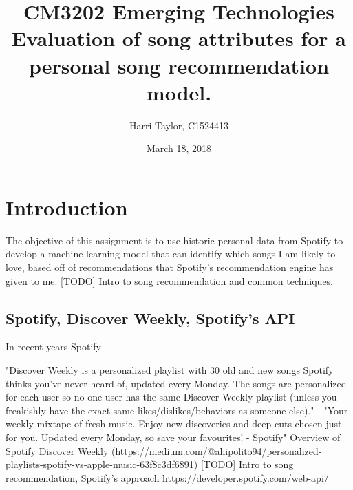 \documentclass{article}
\title{
	CM3202 Emerging Technologies\\
	\large Evaluation of song attributes for a personal song recommendation model.
	}
\author{Harri Taylor, C1524413}
\date{March 18, 2018}
\begin{document}
	\maketitle
	\newpage
	
	\section{Introduction}
	The objective of this assignment is to use historic personal data from Spotify to develop a machine learning model that can identify which songs I am likely to love, based off of recommendations that Spotify's recommendation engine has given to me. [TODO] Intro to song recommendation and common techniques.
	
		\subsection{Spotify, Discover Weekly, Spotify's API}
        In recent years Spotify 

        "Discover Weekly is a personalized playlist with 30 old and new songs Spotify thinks you’ve never heard of, updated every Monday. The songs are personalized for each user so no one user has the same Discover Weekly playlist (unless you freakishly have the exact same likes/dislikes/behaviors as someone else)." - "Your weekly mixtape of fresh music. Enjoy new discoveries and deep cuts chosen just for you. Updated every Monday, so save your favourites! - Spotify"
        Overview of Spotify Discover Weekly (https://medium.com/@ahipolito94/personalized-playlists-spotify-vs-apple-music-63f8c3df6891)
        [TODO] Intro to song recommendation, Spotify's approach https://developer.spotify.com/web-api/
		
\end{document}
